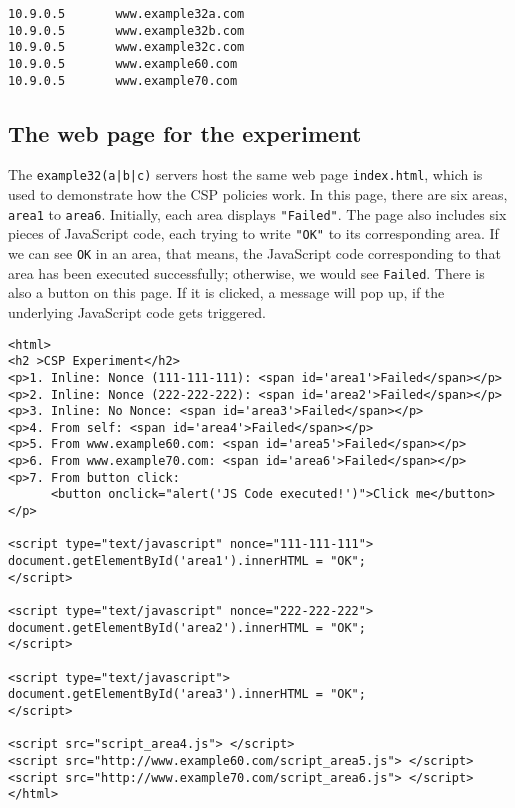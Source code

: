 \begin{lstlisting}
10.9.0.5       www.example32a.com
10.9.0.5       www.example32b.com
10.9.0.5       www.example32c.com
10.9.0.5       www.example60.com
10.9.0.5       www.example70.com
\end{lstlisting}


\subsection{The web page for the experiment}

The \texttt{example32(a|b|c)} servers host 
the same web page \texttt{index.html}, which 
is used to demonstrate how the CSP policies work. 
In this page, there are six areas, \texttt{area1} to \texttt{area6}.
Initially, each area displays \texttt{"Failed"}. The page
also includes six pieces of JavaScript code, each trying to
write \texttt{"OK"} to its corresponding area.  If we can see
\texttt{OK} in an area, that means, the JavaScript code corresponding
to that area has been executed successfully; otherwise, we would see
\texttt{Failed}. There is also a button on this page. 
If it is clicked, a message will pop up, if the underlying 
JavaScript code gets triggered. 


\begin{lstlisting}[caption={The experiment web page \texttt{index.html}}]
<html>
<h2 >CSP Experiment</h2>
<p>1. Inline: Nonce (111-111-111): <span id='area1'>Failed</span></p>
<p>2. Inline: Nonce (222-222-222): <span id='area2'>Failed</span></p>
<p>3. Inline: No Nonce: <span id='area3'>Failed</span></p>
<p>4. From self: <span id='area4'>Failed</span></p>
<p>5. From www.example60.com: <span id='area5'>Failed</span></p>
<p>6. From www.example70.com: <span id='area6'>Failed</span></p>
<p>7. From button click: 
      <button onclick="alert('JS Code executed!')">Click me</button></p>

<script type="text/javascript" nonce="111-111-111">
document.getElementById('area1').innerHTML = "OK";
</script>

<script type="text/javascript" nonce="222-222-222">
document.getElementById('area2').innerHTML = "OK";
</script>

<script type="text/javascript">
document.getElementById('area3').innerHTML = "OK";
</script>

<script src="script_area4.js"> </script>
<script src="http://www.example60.com/script_area5.js"> </script>
<script src="http://www.example70.com/script_area6.js"> </script>
</html>

\end{lstlisting}
 


